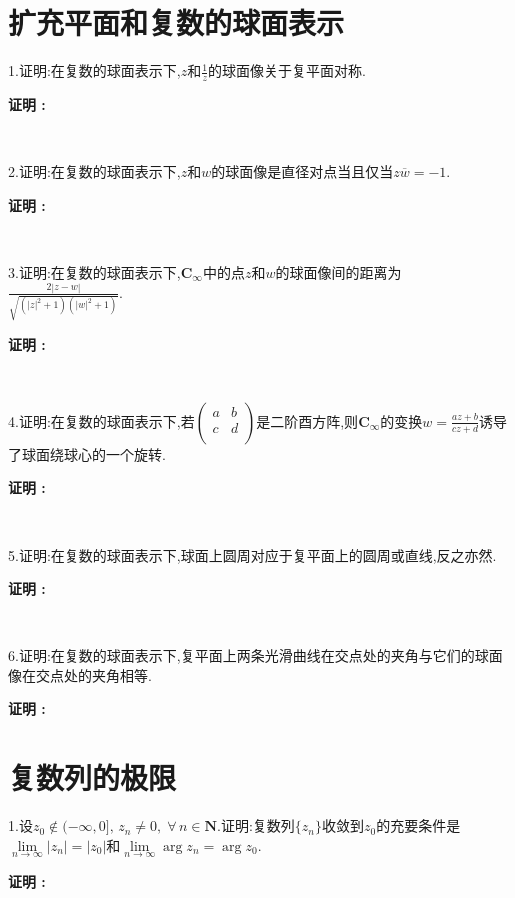 \documentclass[12pt,fontset=none]{ctexbook}
\newenvironment{proof}[1][]{\par \noindent \textbf{\hspace{2em}证明 \vspace{0.1mm} #1 :}}{\par}
\newcommand{\Lin}[1]{\overline{#1}}
\begin{document}
\newpage
\section{扩充平面和复数的球面表示}
1.证明:在复数的球面表示下,$z$和$\frac{1}{z}$的球面像关于复平面对称.
\begin{proof}
  
\end{proof}

\

2.证明:在复数的球面表示下,$z$和$w$的球面像是直径对点当且仅当$z\Lin{w}=-1$.
\begin{proof}
  
\end{proof}

\

3.证明:在复数的球面表示下,$\mathbf{C}_{\infty}$中的点$z$和$w$的球面像间的距离为$\frac{2|z-w|}{\sqrt{(|z|^{2}+1)(|w|^{2}+1)}}$.
\begin{proof}
  
\end{proof}

\

4.证明:在复数的球面表示下,若$\begin{pmatrix}
  a & b \\
  c & d \\
\end{pmatrix}$是二阶酉方阵,则$\mathbf{C}_{\infty}$的变换$w=\frac{az+b}{cz+d}$诱导了球面绕球心的一个旋转.
\begin{proof}
  
\end{proof}

\

5.证明:在复数的球面表示下,球面上圆周对应于复平面上的圆周或直线,反之亦然.
\begin{proof}
  
\end{proof}

\

6.证明:在复数的球面表示下,复平面上两条光滑曲线在交点处的夹角与它们的球面像在交点处的夹角相等.
\begin{proof}
  
\end{proof}

\newpage
\section{复数列的极限}
1.设$z_{0} \notin (-\infty,0],\,z_{n} \neq 0,\; \forall\, n \in \mathbf{N} $.证明:复数列$\{z_{n}\}$收敛到$z_{0}$的充要条件是$\lim\limits_{n \to \infty}|z_{n}|=|z_{0}|$和$\lim\limits_{n \to \infty}\arg z_{n}=\arg z_{0}$.
\begin{proof}
  
\end{proof}
\end{document}
